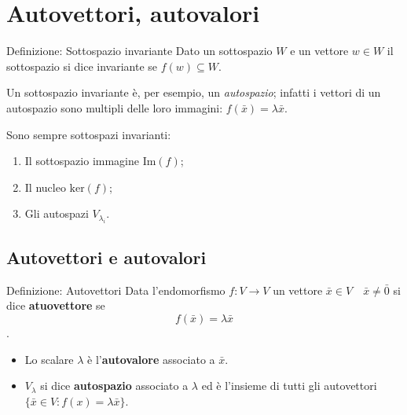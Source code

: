 \documentclass[x11names]{article}
\begin{document}
\newpage
\section{Autovettori, autovalori}



\begin{center}
\colorbox{myblue}{\begin{minipage}{5.75in}
\begin{blues}{Definizione: Sottospazio invariante}
Dato un sottospazio $W$ e un vettore  $w \in W$ il sottospazio si dice invariante se $f\left(w\right) \subseteq W$.

Un sottospazio invariante è, per esempio, un \textit{autospazio}; infatti i vettori di un autospazio sono multipli delle loro immagini: $f\left(\bar{x}\right) = \lambda \bar{x}$.
\end{blues}
\end{minipage}}        
\end{center}

\noindent
Sono sempre sottospazi invarianti:
\begin{enumerate}
	\item Il sottospazio immagine $\text{Im}(f)$;
	\item Il nucleo $\text{ker}(f)$;
	\item Gli autospazi $V_{\lambda_i}$.
\end{enumerate}






\subsection{Autovettori e autovalori}
\begin{center}
\colorbox{myblue}{\begin{minipage}{5.75in}
\begin{blues}{Definizione: Autovettori}
Data l'endomorfismo $f:V\rightarrow V$ un vettore $\bar{x} \in V \quad \bar{x} \neq \bar{0}$  si dice \textbf{atuovettore} se 
\[
f\left(\bar{x}\right) = \lambda \bar{x}
\].
\begin{itemize}
	\item Lo scalare $\lambda$ è l'\textbf{autovalore} associato a $\bar{x}$.
	\item $V_{\lambda}$ si dice \textbf{autospazio} associato a $\lambda$ ed è l'insieme di tutti gli autovettori $\{\bar{x} \in V: f\left(x\right) = \lambda \bar{x}\}$.
\end{itemize}
\end{blues}
\end{minipage}}        
\end{center}
\end{document}
